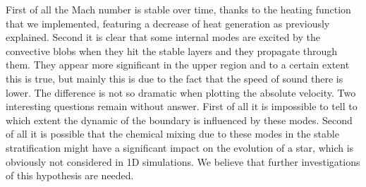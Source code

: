 \begin{figure}[t!]
\centering
{}
\hfill
{}
\caption{}
\label{fig:2dpassive}
\end{figure}

First of all the Mach number is stable over time, thanks to the heating function that we implemented, featuring a decrease of heat generation as previously explained. 
Second it is clear that some internal modes are excited by the convective blobs when they hit the stable layers and they propagate through them. They appear more significant in the upper region and to a certain extent this is true, but mainly this is due to the fact that the speed of sound there is lower. The difference is not so dramatic when plotting the absolute velocity. Two interesting questions remain without answer. First of all it is impossible to tell to which extent the dynamic of the boundary is influenced by these modes. Second of all it is possible that the chemical mixing due to these modes in the stable stratification might have a significant impact on the evolution of a star, which is obviously not considered in 1D simulations. We believe that further investigations of this hypothesis are needed.

